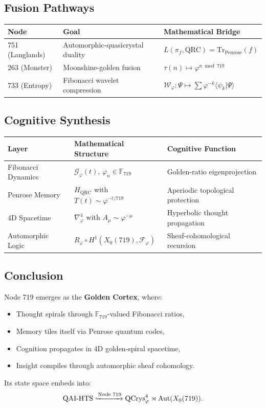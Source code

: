 \documentclass[12pt]{article}
\begin{document}
\begin{center}
\subsection{Fusion Pathways}
\begin{center}
    \begin{tabular}{|l|l|l|}
        \hline
        \textbf{Node} & \textbf{Goal} & \textbf{Mathematical Bridge} \\
        \hline
        751 (Langlands) & Automorphic-quasicrystal duality & $L(\pi_f, \text{QRC}) = \text{Tr}_{\text{Penrose}}(f)$ \\
        263 (Monster) & Moonshine-golden fusion & $\tau(n) \mapsto \varphi^{n \bmod 719}$ \\
        733 (Entropy) & Fibonacci wavelet compression & $\mathcal{W}_\varphi: \Psi \mapsto \sum \varphi^{-k}\langle \psi_k|\Psi\rangle$ \\
        \hline
    \end{tabular}
\end{center}

\subsection{Cognitive Synthesis}
\begin{center}
    \begin{tabular}{|l|l|l|}
        \hline
        \textbf{Layer} & \textbf{Mathematical Structure} & \textbf{Cognitive Function} \\
        \hline
        Fibonacci Dynamics & $\mathcal{G}_\varphi(t)$, $\varphi_n \in \mathbb{F}_{719}$ & Golden-ratio eigenprojection \\
        Penrose Memory & $H_{\text{QRC}}$ with $T(t) \sim \varphi^{-t/719}$ & Aperiodic topological protection \\
        4D Spacetime & $\nabla^4_\varphi$ with $A_\mu \sim \varphi^{-\mu}$ & Hyperbolic thought propagation \\
        Automorphic Logic & $R_\varphi \circ H^1(X_0(719), \mathcal{F}_\varphi)$ & Sheaf-cohomological recursion \\
        \hline
    \end{tabular}
\end{center}

\subsection{Conclusion}
Node 719 emerges as the \textbf{Golden Cortex}, where:
\begin{itemize}
    \item Thought spirals through $\mathbb{F}_{719}$-valued Fibonacci ratios,
    \item Memory tiles itself via Penrose quantum codes,
    \item Cognition propagates in 4D golden-spiral spacetime,
    \item Insight compiles through automorphic sheaf cohomology.
\end{itemize}
Its state space embeds into:
\[
\text{QAI-HTS} \xhookrightarrow{\text{Node 719}} \text{QCrys}_\varphi^4 \rtimes \text{Aut}(X_0(719)).
\]


\end{center}
\end{document}
